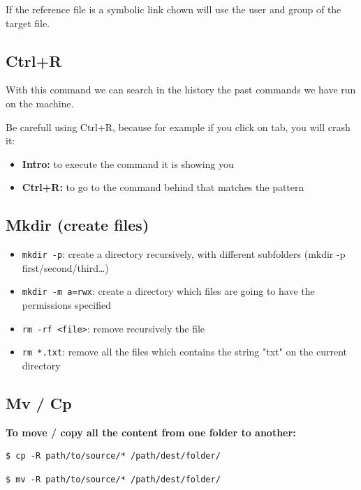 \documentclass{article}
\newenvironment{blocktemplateIII}[1]{%
    \tcolorbox[beamer,%
    noparskip,breakable,
    ,colframe=Red,%
    colbacklower=LimeGreen!75!LightGreen,%
    title=#1]}%
    {\endtcolorbox}
\newenvironment{codetemplate}[1][]{%
  \mybasecolorbox[#1]
  \itshape
}{%
  \endmybasecolorbox
}
\begin{document}
\begin{blocktemplateIII}{WARNING}
If the reference file is a symbolic link chown will use the user and group of the target file.
\end{blocktemplateIII}

\subsection{Ctrl+R}

With this command we can search in the history the past commands we have run on the machine.

Be carefull using Ctrl+R, because for example if you click on tab, you will crash it:

\begin{itemize}
    \item \textbf{Intro:} to execute the command it is showing you
    \item \textbf{Ctrl+R:} to go to the command behind that matches the pattern
\end{itemize}

\subsection{Mkdir (create files)}
\begin{itemize}
    \item \verb+mkdir -p+: create a directory recursively, with different subfolders (mkdir -p first/second/third…)
    \item \verb+mkdir -m a=rwx+: create a directory which files are going to have the permissions specified
    \item \verb+rm -rf <file>+: remove recursively the file
    \item \verb+rm *.txt+: remove all the files which contains the string "txt" on the current directory
\end{itemize}

\subsection{Mv / Cp}
\textbf{To move / copy all the content from one folder to another:}
\begin{codetemplate}{}
\begin{verbatim}
$ cp -R path/to/source/* /path/dest/folder/
\end{verbatim}
\end{codetemplate}
\begin{codetemplate}{}
\begin{verbatim}
$ mv -R path/to/source/* /path/dest/folder/
\end{verbatim}
\end{codetemplate}
\end{document}
